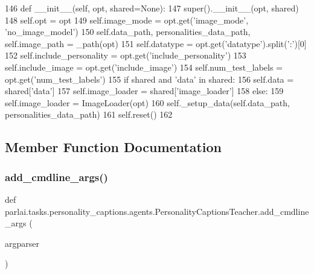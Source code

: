 \begin{DoxyCode}
146     \textcolor{keyword}{def }\_\_init\_\_(self, opt, shared=None):
147         super().\_\_init\_\_(opt, shared)
148         self.opt = opt
149         self.image\_mode = opt.get(\textcolor{stringliteral}{'image\_mode'}, \textcolor{stringliteral}{'no\_image\_model'})
150         self.data\_path, personalities\_data\_path, self.image\_path = \_path(opt)
151         self.datatype = opt.get(\textcolor{stringliteral}{'datatype'}).split(\textcolor{stringliteral}{':'})[0]
152         self.include\_personality = opt.get(\textcolor{stringliteral}{'include\_personality'})
153         self.include\_image = opt.get(\textcolor{stringliteral}{'include\_image'})
154         self.num\_test\_labels = opt.get(\textcolor{stringliteral}{'num\_test\_labels'})
155         \textcolor{keywordflow}{if} shared \textcolor{keywordflow}{and} \textcolor{stringliteral}{'data'} \textcolor{keywordflow}{in} shared:
156             self.data = shared[\textcolor{stringliteral}{'data'}]
157             self.image\_loader = shared[\textcolor{stringliteral}{'image\_loader'}]
158         \textcolor{keywordflow}{else}:
159             self.image\_loader = ImageLoader(opt)
160             self.\_setup\_data(self.data\_path, personalities\_data\_path)
161         self.reset()
162 
\end{DoxyCode}


\subsection{Member Function Documentation}
\mbox{\label{classparlai_1_1tasks_1_1personality__captions_1_1agents_1_1PersonalityCaptionsTeacher_a2207d2726eb0d6e8d8713b9c0c45a961}} 
\subsubsection{\texorpdfstring{add\+\_\+cmdline\+\_\+args()}{add\_cmdline\_args()}}
{\footnotesize\ttfamily def parlai.\+tasks.\+personality\+\_\+captions.\+agents.\+Personality\+Captions\+Teacher.\+add\+\_\+cmdline\+\_\+args (\begin{DoxyParamCaption}\item[{}]{argparser }\end{DoxyParamCaption})\hspace{0.3cm}{\ttfamily [static]}}

